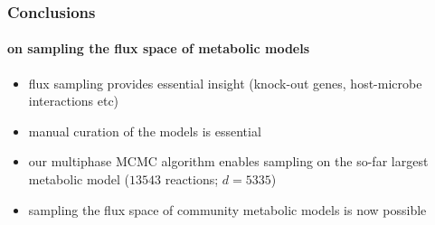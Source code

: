 \documentclass{beamer}
\begin{document}
   \begin{frame}
      \frametitle{Conclusions}
      \framesubtitle{on sampling the flux space of metabolic models}
      \small
      \begin{itemize}
         \item flux sampling provides essential insight (knock-out genes, host-microbe interactions etc)
         \item manual curation of the models is essential 
         \item our multiphase MCMC algorithm enables sampling on the so-far largest metabolic model ($13543$ reactions; $d=5335$)
         \item sampling the flux space of community metabolic models is now possible
      \end{itemize}

   \end{frame}
\end{document}
